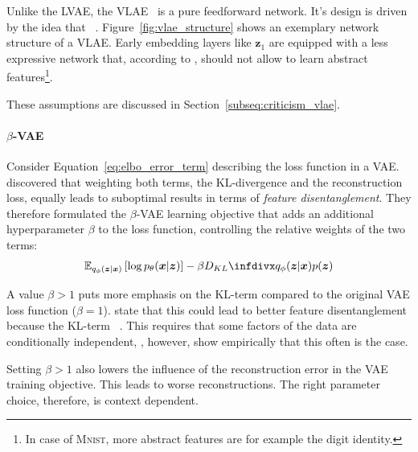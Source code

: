 Unlike the \ac{LVAE}, the \ac{VLAE}~\citep{zhao2017learning} is a pure feedforward network.
It's design is driven by the idea that ~\citep{zhao2017learning}.
Figure~\ref{fig:vlae_structure} shows an exemplary network structure of a \ac{VLAE}.
Early embedding layers like $\bm{z}_1$ are equipped with a less expressive network that, according to \citet{zhao2017learning}, should not allow to learn abstract features\footnote{In case of \textsc{Mnist}, more abstract features are for example the digit identity.}.

These assumptions are discussed in Section~\ref{subseq:criticism_vlae}.

\paragraph{$\beta$-VAE}

Consider Equation~\ref{eq:elbo_error_term} describing the loss function in a \ac{VAE}.
\citet{higgins2017beta} discovered that weighting both terms, the KL-divergence and the reconstruction loss, equally leads to suboptimal results in terms of \textit{feature disentanglement}.
They therefore formulated the $\beta$-VAE learning objective that adds an additional hyperparameter $\beta$ to the loss function, controlling the relative weights of the two terms:
\begin{align}
    \mathbb{E}_{q_{\phi}(\bm{z} | \bm{x})}\left[\log p_{\theta}(\bm{x} | \bm{z})\right]-\beta \kldiv{q_{\phi}(\bm{z} | \bm{x})}{p(\bm{z})}
\end{align}

A value $\beta > 1$ puts more emphasis on the KL-term compared to the original \ac{VAE} loss function ($\beta = 1$).
\citet{higgins2017beta} state that this could lead to better feature disentanglement because the KL-term ~\citep{higgins2017beta}.
This requires that some factors of the data are conditionally independent, \citet{higgins2017beta}, however, show empirically that this often is the case.

Setting $\beta > 1$ also lowers the influence of the reconstruction error in the \ac{VAE} training objective.
This leads to worse reconstructions.
The right parameter choice, therefore, is context dependent.

